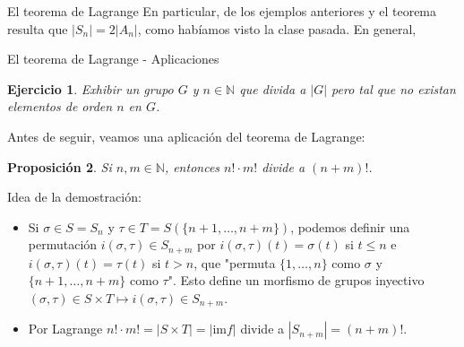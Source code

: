 \documentclass{beamer}
\def\N{\mathbb{N}}
\newtheorem{teorema}{Teorema} [section]
\newtheorem{corolario}[teorema]{Corolario}
\newtheorem{ejercicio}[teorema]{Ejercicio}
\newtheorem{proposicion}[teorema]{Proposici\'on}
\begin{document}
\begin{frame}{El teorema de Lagrange}
   En particular, de los ejemplos anteriores y el teorema resulta que $|S_n| = 2|A_n|$, como habíamos visto la clase pasada. En general,
\end{frame}


\begin{frame}{El teorema de Lagrange - Aplicaciones}
\begin{ejercicio}Exhibir un grupo $G$ y $n \in \N$ que divida a $|G|$ pero tal que no existan elementos de orden $n$ en $G$.
\end{ejercicio}

Antes de seguir, veamos una aplicación del teorema de Lagrange:
\begin{proposicion} Si $n,m \in \N$, entonces $n!\cdot m!$ divide a $(n+m)!$.
\end{proposicion}
 \alert{Idea de la demostración:}
\begin{itemize}
\item Si $\sigma \in S = S_n$ y $\tau \in T= S(\{n+1,\dots, n+m\})$, podemos definir una permutación $i(\sigma, \tau) \in S_{n+m}$ por $i(\sigma,\tau)(t) = \sigma(t)$ si $t \leq n $ e $i(\sigma, \tau)(t) = \tau(t)$ si $t > n$, que "permuta $\{1,\dots, n\}$ como $\sigma$ y $\{n+1,\dots, n+m\}$ como $\tau$". Esto define un morfismo de grupos inyectivo $(\sigma, \tau) \in S \times T \mapsto i(\sigma, \tau) \in S_{n+m}$.
\item Por Lagrange $n!\cdot m! = |S \times T| = |\mathrm{im} f|$ divide a $|S_{n+m}| = (n+m)!$.
\end{itemize} 
\end{frame}
\end{document}
